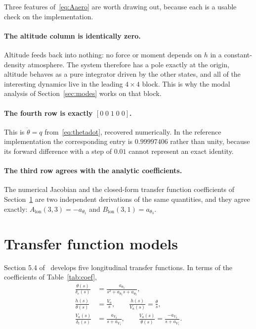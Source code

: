\documentclass[11pt,a4paper]{article}
\newcommand{\lon}{\mathrm{lon}}
\newcommand{\dt}{\delta_t}
\newcommand{\de}{\delta_e}
\begin{document}
Three features of~\eqref{eq:Aaero} are worth drawing out, because each is a usable
check on the implementation.

\paragraph{The altitude column is identically zero.} Altitude feeds back into
nothing: no force or moment depends on $h$ in a constant-density atmosphere. The
system therefore has a pole exactly at the origin, altitude behaves as a pure
integrator driven by the other states, and all of the interesting dynamics live in
the leading $4\times4$ block. This is why the modal analysis of
Section~\ref{sec:modes} works on that block.

\paragraph{The fourth row is exactly $[0\;0\;1\;0\;0]$.} This is
$\dot\theta = q$ from~\eqref{eq:thetadot}, recovered numerically. In the reference
implementation the corresponding entry is $0.99997406$ rather than unity, because
its forward difference with a step of $0.01$ cannot represent an exact identity.

\paragraph{The third row agrees with the analytic coefficients.} The numerical
Jacobian and the closed-form transfer function coefficients of
Section~\ref{sec:tf} are two independent derivations of the same quantities, and
they agree exactly: $A_\lon(3,3) = -a_{\theta_1}$ and
$B_\lon(3,1) = a_{\theta_3}$.

\section{Transfer function models}\label{sec:tf}

Section 5.4 of~\cite{beard} develops five longitudinal transfer functions. In
terms of the coefficients of Table~\ref{tab:coef},
\begin{align}
  \frac{\theta(s)}{\de(s)} &=
    \frac{a_{\theta_3}}{s^2 + a_{\theta_1}s + a_{\theta_2}}, \label{eq:Tth}\\
  \frac{h(s)}{\theta(s)} &= \frac{V_a}{s}, \qquad
  \frac{h(s)}{V_a(s)} = \frac{\theta}{s}, \label{eq:Th}\\
  \frac{V_a(s)}{\dt(s)} &= \frac{a_{V_2}}{s + a_{V_1}}, \qquad
  \frac{V_a(s)}{\theta(s)} = \frac{-a_{V_3}}{s + a_{V_1}}. \label{eq:TV}
\end{align}
\end{document}

